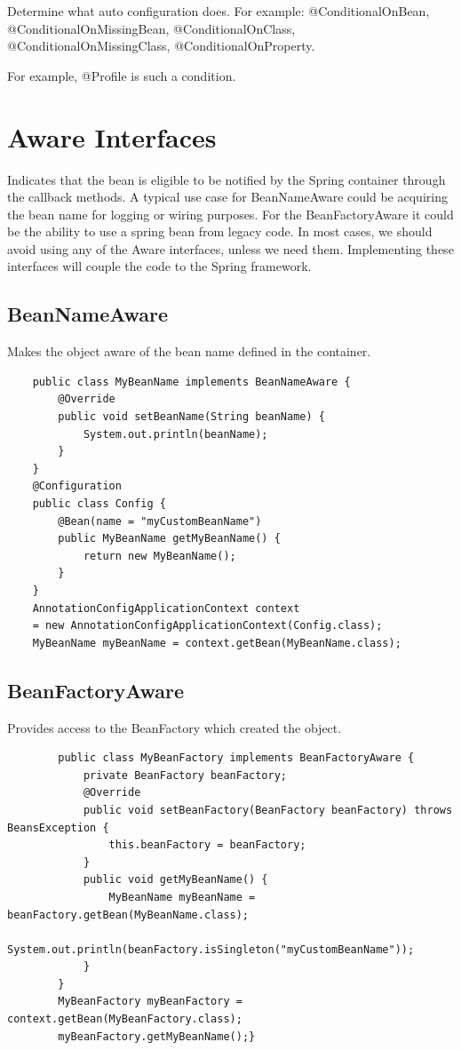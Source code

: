 \documentclass{scrartcl}
\begin{document}
Determine what auto configuration does. For example: @ConditionalOnBean, @ConditionalOnMissingBean, @ConditionalOnClass, @ConditionalOnMissingClass, @ConditionalOnProperty.

For example, @Profile is such a condition.


\section{Aware Interfaces}

    Indicates that the bean is eligible to be notified by the Spring container through the callback methods.
    A typical use case for BeanNameAware could be acquiring the bean name for logging or wiring purposes. For the BeanFactoryAware it could be the ability to use a spring bean from legacy code.
    In most cases, we should avoid using any of the Aware interfaces, unless we need them. Implementing these interfaces will couple the code to the Spring framework.

\subsection{BeanNameAware}

    Makes the object aware of the bean name defined in the container.

\begin{lstlisting}
    public class MyBeanName implements BeanNameAware {
        @Override
        public void setBeanName(String beanName) {
            System.out.println(beanName);
        }
    }
    @Configuration
    public class Config {
        @Bean(name = "myCustomBeanName")
        public MyBeanName getMyBeanName() {
            return new MyBeanName();
        }
    }
    AnnotationConfigApplicationContext context
    = new AnnotationConfigApplicationContext(Config.class);
    MyBeanName myBeanName = context.getBean(MyBeanName.class);

\end{lstlisting}

\subsection{BeanFactoryAware}

    Provides access to the BeanFactory which created the object.

    \begin{lstlisting}
        public class MyBeanFactory implements BeanFactoryAware {
            private BeanFactory beanFactory;
            @Override
            public void setBeanFactory(BeanFactory beanFactory) throws BeansException {
                this.beanFactory = beanFactory;
            }
            public void getMyBeanName() {
                MyBeanName myBeanName = beanFactory.getBean(MyBeanName.class);
                System.out.println(beanFactory.isSingleton("myCustomBeanName"));
            }
        }
        MyBeanFactory myBeanFactory = context.getBean(MyBeanFactory.class);
        myBeanFactory.getMyBeanName();}
    \end{lstlisting}
\end{document}
